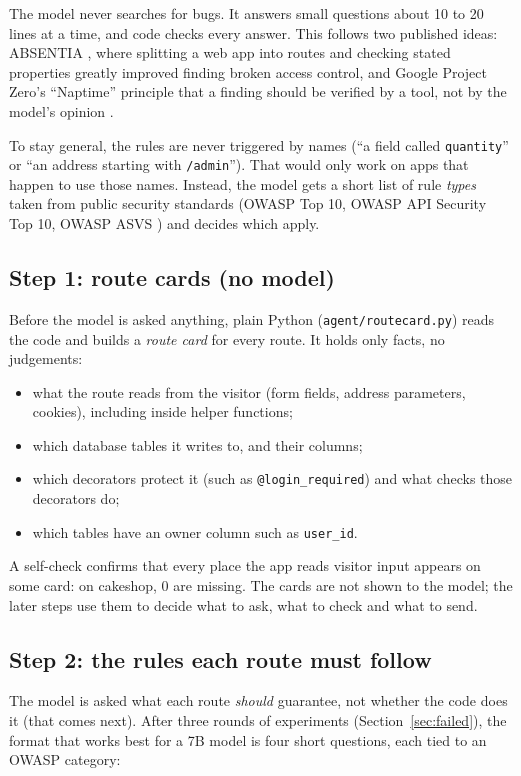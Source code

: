 \documentclass[11pt,a4paper]{article}
\newcommand{\code}[1]{\texttt{#1}}
\begin{document}
The model never searches for bugs. It answers small questions about 10 to 20 lines at a time, and code
checks every answer. This follows two published ideas: ABSENTIA \cite{absentia}, where splitting a web app
into routes and checking stated properties greatly improved finding broken access control, and Google
Project Zero's ``Naptime'' principle that a finding should be verified by a tool, not by the model's
opinion \cite{naptime}.

To stay general, the rules are never triggered by names (``a field called \code{quantity}'' or ``an address
starting with \code{/admin}''). That would only work on apps that happen to use those names. Instead, the
model gets a short list of rule \emph{types} taken from public security standards (OWASP Top 10, OWASP API
Security Top 10, OWASP ASVS \cite{owasptop10,owaspapi,owaspasvs}) and decides which apply.

\subsection{Step 1: route cards (no model)}
Before the model is asked anything, plain Python (\code{agent/routecard.py}) reads the code and builds a
\emph{route card} for every route. It holds only facts, no judgements:

\begin{itemize}
  \item what the route reads from the visitor (form fields, address parameters, cookies), including inside
        helper functions;
  \item which database tables it writes to, and their columns;
  \item which decorators protect it (such as \code{@login\_required}) and what checks those decorators do;
  \item which tables have an owner column such as \code{user\_id}.
\end{itemize}

A self-check confirms that every place the app reads visitor input appears on some card: on cakeshop,
0 are missing. The cards are not shown to the model; the later steps use them to decide what to ask, what
to check and what to send.

\subsection{Step 2: the rules each route must follow}
\label{sec:rules}
The model is asked what each route \emph{should} guarantee, not whether the code does it (that comes next).
After three rounds of experiments (Section~\ref{sec:failed}), the format that works best for a 7B model is
four short questions, each tied to an OWASP category:
\end{document}
